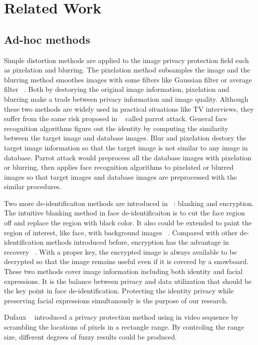 \chapter{Related Work}

\section{Ad-hoc methods}
	Simple distortion methods are applied to the image privacy protection field such as pixelation and blurring. The pixelation method subsamples the image and the blurring method smoothes images with some filters like Gaussian filter or average filter ~\cite{Agrawal09,Boyle00}. Both by destorying the original image information, pixelation and blurring make a trade between privacy information and image quality. Although these two methods are widely used in practical situations like TV interviews, they suffer from the same risk proposed in ~\cite{Newton05} called parrot attack. General face recognition algorithms figure out the identity by computing the similarity between the target image and database images. Blur and pixelation destory the target image information so that the target image is not similar to any image in database. Parrot attack would preprocess all the database images with pixelation or blurring, then applies face recognition algorithms to pixelated or blurred images so that target images and database images are preprocessed with the similar procedures. 

	\par
	Two more de-identificaiton methods are introduced in ~\cite{Winkler14}: blanking and encryption. The intuitive blanking method in face de-identificaiton is to cut the face region off and replace the region with black color. It also could be extended to paint the region of interest, like face, with background images  ~\cite{inpaint09,Qureshi09}. Compared with other de-identification methods introduced before, encryption has the advantage in recovery ~\cite{Boult05}. With a proper key, the encrypted image is always available to be decrypted so that the image remains useful even if it is covered by a snowboard. These two methods cover image information including both identity and facial expressions. It is the balance between privacy and data utilization that should be the key point in face de-identification. Protecting the identity privacy while preserving facial expressions simultanously is the purpose of our research. 
	
	\par
	Dufaux ~\cite{dufaux08} introduced a privacy protection method using in video sequence by scrambling the locations of pixels in a rectangle range. By controling the range size, different degrees of fuzzy results could be produced. 


